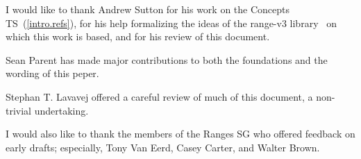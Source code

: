 
\pnum
I would like to thank Andrew Sutton for his work on the Concepts TS~(\ref{intro.refs}),
for his help formalizing the ideas of the range-v3 library~\cite{range-v3} on which this
work is based, and for his review of this document.

\pnum
Sean Parent has made major contributions to both the foundations and the wording of this
peper.

\pnum
Stephan T. Lavavej offered a careful review of much of this document, a non-trivial undertaking.

\pnum
I would also like to thank the members of the Ranges SG who offered feedback on early drafts;
especially, Tony Van Eerd, Casey Carter, and Walter Brown.
